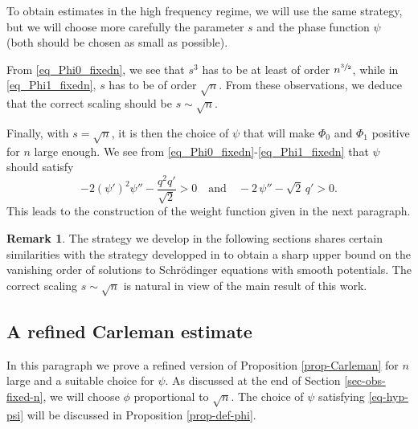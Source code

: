 \documentclass[11pt]{article}
\numberwithin{equation}{section}
\theoremstyle{plain}
\theoremstyle{definition}
\newtheorem{remark}[theorem]{Remark}
\newcommand{\1}{\mathds 1}
\let\vf\phi
\begin{document}
To obtain estimates in the high frequency regime, we will use the same strategy, but we will choose more carefully the parameter $s$ and the phase function $\psi$ (both should be chosen as small as possible).

From \eqref{eq_Phi0_fixedn}, we see that $s^3$ has to be at least of order $n^{\sfrac{3}{2}}$, while in \eqref{eq_Phi1_fixedn}, $s$
has to be of order $\sqrt n$. From these observations, we deduce that the correct scaling should be $s \sim \sqrt n$.

Finally, with $s = \sqrt n$, it is then the choice of $\psi$ that will make $\Phi_0$ and $\Phi_1$ positive for $n$ large enough.
We see from \eqref{eq_Phi0_fixedn}-\eqref{eq_Phi1_fixedn} that $\psi$ should satisfy
\begin{equation} \label{eq-hyp-psi}
-2 (\psi')^2 \psi'' - \frac{q^2q'}{\sqrt{2}} > 0 \quad \text{and} \quad - 2\,\psi'' - \sqrt{2}\, q' >0.
\end{equation}
This leads to the construction of the weight function given in the next paragraph.

\begin{remark}
The strategy we develop in the following sections shares certain similarities with the strategy developped in \cite{Bakri12} to obtain a sharp upper bound on the vanishing order of solutions to Schrödinger equations with smooth potentials. The correct scaling $s \sim \sqrt n$ is natural in view of the main result of this work.
\end{remark}

\subsection{A refined Carleman estimate}

In this paragraph we prove a refined version of Proposition \ref{prop-Carleman} for $n$ large and a suitable choice for $\psi$. As discussed at the end of Section \ref{sec-obs-fixed-n}, we will choose $\vf$ proportional to $\sqrt n$. The choice of $\psi$ satisfying \eqref{eq-hyp-psi} will be discussed in Proposition \ref{prop-def-phi}.
\end{document}
